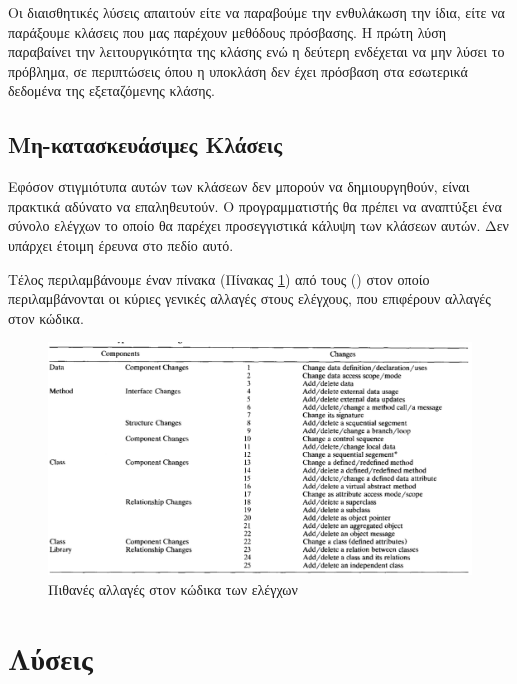 \documentclass[12pt]{article}
\begin{document}
\par Οι διαισθητικές λύσεις απαιτούν  είτε να παραβούμε την ενθυλάκωση την ίδια, είτε να παράξουμε κλάσεις που μας παρέχουν μεθόδους πρόσβασης. Η πρώτη λύση παραβαίνει την λειτουργικότητα της κλάσης ενώ η δεύτερη ενδέχεται να μην λύσει το πρόβλημα, σε περιπτώσεις όπου η υποκλάση δεν έχει πρόσβαση στα εσωτερικά δεδομένα της εξεταζόμενης κλάσης.

\subsection{Μη-κατασκευάσιμες Κλάσεις}

Εφόσον στιγμιότυπα αυτών των κλάσεων δεν μπορούν να δημιουργηθούν, είναι πρακτικά αδύνατο να επαληθευτούν. Ο προγραμματιστής θα πρέπει να αναπτύξει ένα σύνολο ελέγχων το οποίο θα παρέχει προσεγγιστικά κάλυψη των κλάσεων αυτών. Δεν υπάρχει έτοιμη έρευνα στο πεδίο αυτό.\newline

\par Τέλος περιλαμβάνουμε έναν πίνακα (Πίνακας \ref{fig:panos}) από τους (\textcite{kung}) στον οποίο περιλαμβάνονται οι κύριες γενικές αλλαγές στους ελέγχους, που επιφέρουν αλλαγές στον κώδικα.

\begin{figure}
\label{fig:panos}
\caption{Πιθανές αλλαγές στον κώδικα των ελέγχων}
\includegraphics[width=\textwidth,height=\textheight,keepaspectratio]{code_changes_table.PNG}
\end{figure}

\section{Λύσεις}
\end{document}
